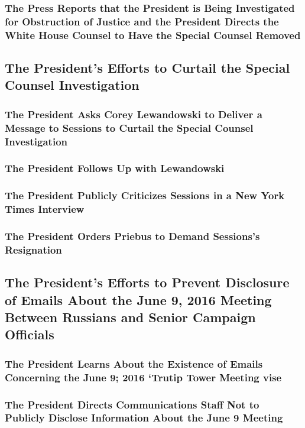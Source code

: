 \subsubsection{The Press Reports that the President is Being Investigated for Obstruction of Justice and the President Directs the White House Counsel to Have the Special Counsel Removed}

\subsection{The President’s Efforts to Curtail the Special Counsel Investigation}

\subsubsection{The President Asks Corey Lewandowski to Deliver a Message to Sessions to Curtail the Special Counsel Investigation}

\subsubsection{The President Follows Up with Lewandowski}

\subsubsection{The President Publicly Criticizes Sessions in a New York Times Interview}

\subsubsection{The President Orders Priebus to Demand Sessions’s Resignation}

\subsection{The President’s Efforts to Prevent Disclosure of Emails About the June 9, 2016 Meeting Between Russians and Senior Campaign Officials}

\subsubsection{The President Learns About the Existence of Emails Concerning the June 9; 2016 ‘Trutip Tower Meeting vise}

\subsubsection{The President Directs Communications Staff Not to Publicly Disclose Information About the June 9 Meeting}

